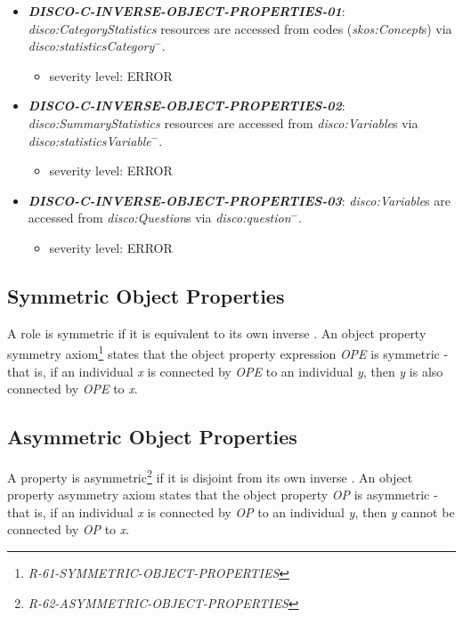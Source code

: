 \documentclass{llncs}
\begin{document}
\begin{itemize}
	\item \textbf{{\em DISCO-C-INVERSE-OBJECT-PROPERTIES-01}}:
	\emph{disco:CategoryStatistics} resources are accessed from codes (\emph{skos:Concept}s) via \emph{disco:statisticsCategory}$^{-}$.
	\begin{itemize}
		\item severity level: ERROR
	\end{itemize}
	\item \textbf{{\em DISCO-C-INVERSE-OBJECT-PROPERTIES-02}}:
	\emph{disco:SummaryStatistics} resources are accessed from \emph{disco:Variable}s via \emph{disco:statisticsVariable}$^{-}$.
	\begin{itemize}
		\item severity level: ERROR
	\end{itemize}
	\item \textbf{{\em DISCO-C-INVERSE-OBJECT-PROPERTIES-03}}:
	\emph{disco:Variable}s are accessed from \emph{disco:Question}s via \emph{disco:question}$^{-}$.
	\begin{itemize}
		\item severity level: ERROR
	\end{itemize}
\end{itemize}

\subsection{Symmetric Object Properties}

A role is symmetric if it is equivalent to its own inverse \cite{Kroetzsch2012}.
An object property symmetry axiom\footnote{\emph{R-61-SYMMETRIC-OBJECT-PROPERTIES}} states that the object property expression \emph{OPE} is symmetric - that is, if an individual \emph{x} is connected by \emph{OPE} to an individual \emph{y}, then \emph{y} is also connected by \emph{OPE} to \emph{x}. 	

\subsection{Asymmetric Object Properties}

A property is asymmetric\footnote{{\em R-62-ASYMMETRIC-OBJECT-PROPERTIES}} if it is disjoint from its own inverse \cite{Kroetzsch2012}.
An object property asymmetry axiom states that the object property \emph{OP} is asymmetric - that is, if an individual \emph{x} is connected by \emph{OP} to an individual \emph{y}, then \emph{y} cannot be connected by \emph{OP} to \emph{x}. 
\end{document}
